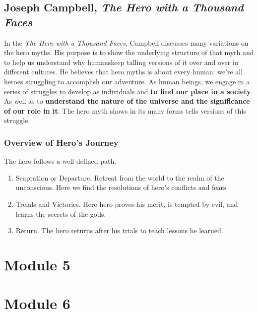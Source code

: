 \documentclass{article}
\begin{document}
\subsection{Joseph Campbell, \textit{The Hero with a Thousand Faces}}

In the \textit{The Hero with a Thousand Faces}, Campbell discusses many variations on the hero myths. His purpose is to show the underlying structure of that myth and to help us understand why humanskeep talling versions of it over and over in different cultures. He believes that hero myths is about every human: we're all heroes struggling to accomplish our adventure. As human beings, we engage in a series of struggles to develop as individuals and \textbf{to find our place in a society}. As well as to \textbf{understand the nature of the universe and the significance of our role in it}. The hero myth shows in its many forms tells versions of this struggle.

\subsubsection{Overview of Hero's Journey}

The hero follows a well-defined path.

\begin{enumerate}
    \item Seapration or Departure. Retreat from the world to the realm of the unconscious. Here we find the resolutions of hero's conflicts and fears.
    \item Treials and Victories. Here hero proves his merit, is tempted by evil, and learns the secrets of the gods.
    \item Return. The hero returns after his trials to teach lessons he learned.
\end{enumerate}

\section{Module 5}
\section{Module 6}
\end{document}
